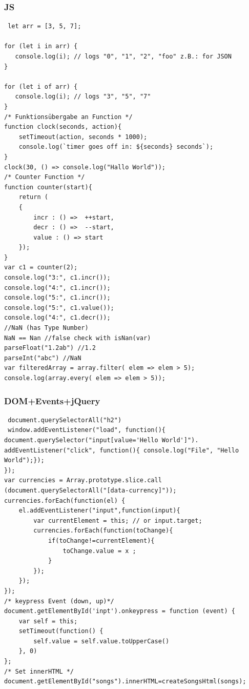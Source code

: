 \begin{multicols*}{4}
\subsubsection{JS}
 \begin{verbatim}
 let arr = [3, 5, 7];

for (let i in arr) {
   console.log(i); // logs "0", "1", "2", "foo" z.B.: for JSON
}

for (let i of arr) {
   console.log(i); // logs "3", "5", "7"
}
/* Funktionsübergabe an Function */
function clock(seconds, action){
    setTimeout(action, seconds * 1000);
    console.log(`timer goes off in: ${seconds} seconds`);
}
clock(30, () => console.log("Hallo World"));
/* Counter Function */
function counter(start){
    return (
    {
        incr : () =>  ++start,
        decr : () =>  --start,
        value : () => start
    });
}
var c1 = counter(2);
console.log("3:", c1.incr());
console.log("4:", c1.incr());
console.log("5:", c1.incr());
console.log("5:", c1.value());
console.log("4:", c1.decr());
//NaN (has Type Number)
NaN == Nan //false check with isNan(var)
parseFloat("1.2ab") //1.2
parseInt("abc") //NaN
var filteredArray = array.filter( elem => elem > 5); 
console.log(array.every( elem => elem > 5));
 \end{verbatim}

\subsubsection{DOM+Events+jQuery}
 \begin{verbatim}
 document.querySelectorAll("h2")
 window.addEventListener("load", function(){
document.querySelector("input[value='Hello World']").
addEventListener("click", function(){ console.log("File", "Hello World");});
});
var currencies = Array.prototype.slice.call
(document.querySelectorAll("[data-currency]"));
currencies.forEach(function(el) {
    el.addEventListener("input",function(input){
        var currentElement = this; // or input.target;
        currencies.forEach(function(toChange){
            if(toChange!=currentElement){
                toChange.value = x ;
            }
        });
    });
}); 
/* keypress Event (down, up)*/
document.getElementById('inpt').onkeypress = function (event) {
    var self = this;
    setTimeout(function() {
        self.value = self.value.toUpperCase()
    }, 0)
};
/* Set innerHTML */
document.getElementById("songs").innerHTML=createSongsHtml(songs);
\end{verbatim}


\end{multicols*}
